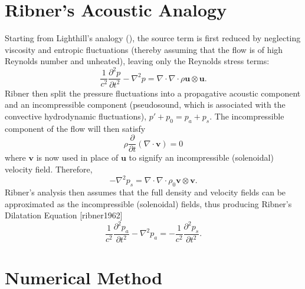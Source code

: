 \section{Ribner's Acoustic Analogy}
Starting from Lighthill's analogy (), the source term is first reduced by neglecting viscosity and entropic fluctuations (thereby assuming that the flow is of high Reynolds number and unheated), leaving only the Reynolds stress terms:
\begin{equation}
	\frac{1}{c^2}\frac{\partial^2 p}{\partial t^2} - \nabla^2 p = \nabla \cdot \nabla \cdot \rho \mathbf{u} \otimes \mathbf{u}.
\end{equation}
Ribner then split the pressure fluctuations into a propagative acoustic component and an incompressible component (pseudosound, which is associated with the convective hydrodynamic fluctuations), $p' + p_0 = p_a + p_s$. 
The incompressible component of the flow will then satisfy
\begin{equation}
	 \rho \frac{\partial}{\partial t} (\nabla \cdot \mathbf{v} )  = 0
\end{equation}
where $\mathbf{v}$ is now used in place of $\mathbf{u}$ to signify an incompressible (solenoidal) velocity field. 
Therefore, 
\begin{equation}
	- \nabla^2 p_s = \nabla \cdot \nabla \cdot \rho_0 \mathbf{v} \otimes \mathbf{v}.
\end{equation}
Ribner's analysis then assumes that the full density and velocity fields can be approximated as the incompressible (solenoidal) fields, thus producing Ribner's Dilatation Equation [ribner1962]
\begin{equation}
	\frac{1}{c^2}\frac{\partial^2 p_a}{\partial t^2} - \nabla^2 p_a = -\frac{1}{c^2}\frac{\partial^2 p_s}{\partial t^2}.
\end{equation} 

\section{Numerical Method}
